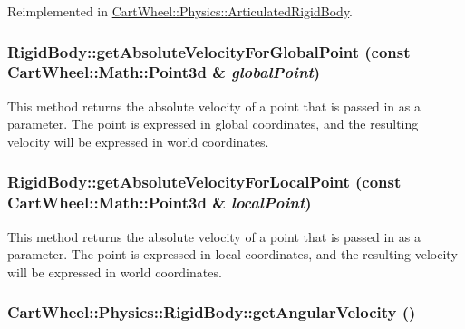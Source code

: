 Reimplemented in \hyperlink{classCartWheel_1_1Physics_1_1ArticulatedRigidBody_a59e3001f695f399dec34833dbb5871f0}{CartWheel::Physics::ArticulatedRigidBody}.

\hypertarget{classCartWheel_1_1Physics_1_1RigidBody_a8876796e4d15bec1a363f0fd550dad19}{
\subsubsection[{getAbsoluteVelocityForGlobalPoint}]{ RigidBody::getAbsoluteVelocityForGlobalPoint (const {\bf CartWheel::Math::Point3d} \& {\em globalPoint})}}
\label{classCartWheel_1_1Physics_1_1RigidBody_a8876796e4d15bec1a363f0fd550dad19}
This method returns the absolute velocity of a point that is passed in as a parameter. The point is expressed in global coordinates, and the resulting velocity will be expressed in world coordinates. \hypertarget{classCartWheel_1_1Physics_1_1RigidBody_a41e008a18204263356311816ee5039c2}{
\subsubsection[{getAbsoluteVelocityForLocalPoint}]{ RigidBody::getAbsoluteVelocityForLocalPoint (const {\bf CartWheel::Math::Point3d} \& {\em localPoint})}}
\label{classCartWheel_1_1Physics_1_1RigidBody_a41e008a18204263356311816ee5039c2}
This method returns the absolute velocity of a point that is passed in as a parameter. The point is expressed in local coordinates, and the resulting velocity will be expressed in world coordinates. \hypertarget{classCartWheel_1_1Physics_1_1RigidBody_ad0587e004de409e67de60eda3987f98b}{
\subsubsection[{getAngularVelocity}]{ CartWheel::Physics::RigidBody::getAngularVelocity ()}}

